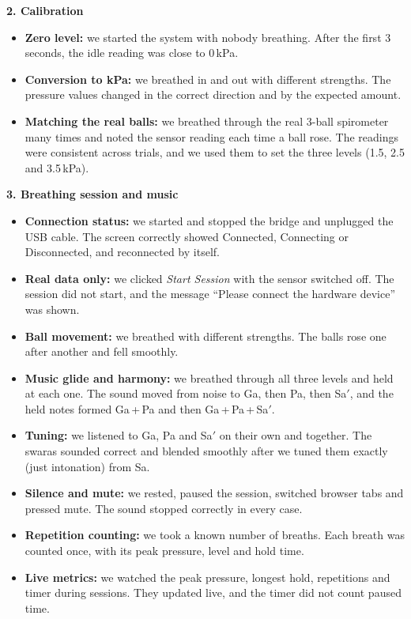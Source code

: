 \documentclass[12pt,a4paper]{article}
\newcommand{\Sah}{Sa\ensuremath{'}}     %
\begin{document}
\textbf{2. Calibration}
\begin{itemize}
  \item \textbf{Zero level:} we started the system with nobody breathing. After the first 3 seconds, the idle reading was close to 0\,kPa.
  \item \textbf{Conversion to kPa:} we breathed in and out with different strengths. The pressure values changed in the correct direction and by the expected amount.
  \item \textbf{Matching the real balls:} we breathed through the real 3-ball spirometer many times and noted the sensor reading each time a ball rose. The readings were consistent across trials, and we used them to set the three levels (1.5, 2.5 and 3.5\,kPa).
\end{itemize}

\textbf{3. Breathing session and music}
\begin{itemize}
  \item \textbf{Connection status:} we started and stopped the bridge and unplugged the USB cable. The screen correctly showed Connected, Connecting or Disconnected, and reconnected by itself.
  \item \textbf{Real data only:} we clicked \emph{Start Session} with the sensor switched off. The session did not start, and the message ``Please connect the hardware device'' was shown.
  \item \textbf{Ball movement:} we breathed with different strengths. The balls rose one after another and fell smoothly.
  \item \textbf{Music glide and harmony:} we breathed through all three levels and held at each one. The sound moved from noise to Ga, then Pa, then \Sah, and the held notes formed Ga\,+\,Pa and then Ga\,+\,Pa\,+\,\Sah.
  \item \textbf{Tuning:} we listened to Ga, Pa and \Sah{} on their own and together. The swaras sounded correct and blended smoothly after we tuned them exactly (just intonation) from Sa.
  \item \textbf{Silence and mute:} we rested, paused the session, switched browser tabs and pressed mute. The sound stopped correctly in every case.
  \item \textbf{Repetition counting:} we took a known number of breaths. Each breath was counted once, with its peak pressure, level and hold time.
  \item \textbf{Live metrics:} we watched the peak pressure, longest hold, repetitions and timer during sessions. They updated live, and the timer did not count paused time.
\end{itemize}
\end{document}
